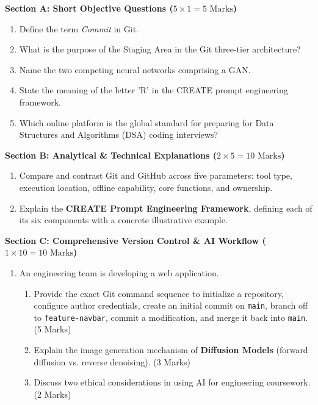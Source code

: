 \begin{chaptertest}
\noindent\textbf{Section A: Short Objective Questions ($5 \times 1 = 5\text{ Marks}$)}
\begin{enumerate}[leftmargin=1.5em]
    \item Define the term \textit{Commit} in Git.
    \item What is the purpose of the Staging Area in the Git three-tier architecture?
    \item Name the two competing neural networks comprising a GAN.
    \item State the meaning of the letter 'R' in the CREATE prompt engineering framework.
    \item Which online platform is the global standard for preparing for Data Structures and Algorithms (DSA) coding interviews?
\end{enumerate}

\medskip
\noindent\textbf{Section B: Analytical \& Technical Explanations ($2 \times 5 = 10\text{ Marks}$)}
\begin{enumerate}[leftmargin=1.5em, start=6]
    \item Compare and contrast Git and GitHub across five parameters: tool type, execution location, offline capability, core functions, and ownership.
    \item Explain the \textbf{CREATE Prompt Engineering Framework}, defining each of its six components with a concrete illustrative example.
\end{enumerate}

\medskip
\noindent\textbf{Section C: Comprehensive Version Control \& AI Workflow ($1 \times 10 = 10\text{ Marks}$)}
\begin{enumerate}[leftmargin=1.5em, start=8]
    \item An engineering team is developing a web application.
    \begin{enumerate}[label=(\alph*)]
        \item Provide the exact Git command sequence to initialize a repository, configure author credentials, create an initial commit on \texttt{main}, branch off to \texttt{feature-navbar}, commit a modification, and merge it back into \texttt{main}. (5 Marks)
        \item Explain the image generation mechanism of \textbf{Diffusion Models} (forward diffusion vs. reverse denoising). (3 Marks)
        \item Discuss two ethical considerations in using AI for engineering coursework. (2 Marks)
    \end{enumerate}
\end{enumerate}
\end{chaptertest}

